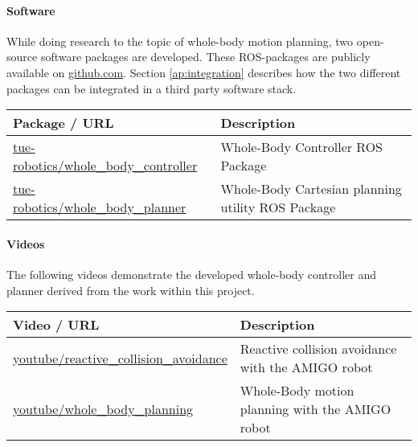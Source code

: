 \paragraph{Software}
While doing research to the topic of whole-body motion planning, two open-source software packages are developed. These ROS-packages are publicly available on \href{http://github.com}{github.com}. Section \ref{ap:integration} describes how the two different packages can be integrated in a third party software stack.
\begin{longtable}{|p{6cm}p{9cm}|}
\hline
\rowcolor[gray]{0.8} \bf Package / URL & \bf Description\\
\hline
\href{https://github.com/tue-robotics/amigo_whole_body_controller}{tue-robotics/whole\_body\_controller} & Whole-Body Controller ROS Package \\
\href{https://github.com/tue-robotics/whole_body_planner}{tue-robotics/whole\_body\_planner} & Whole-Body Cartesian planning utility ROS Package \\
\hline
\end{longtable}

\paragraph{Videos}
\label{videos}
The following videos demonstrate the developed whole-body controller and planner derived from the work within this project. 
\begin{longtable}{|p{6cm}p{9cm}|}
\hline
\rowcolor[gray]{0.8} \bf Video / URL & \bf Description\\
\hline
\href{https://youtu.be/7GcLU9l65eM}{youtube/reactive\_collision\_avoidance} & Reactive collision avoidance with the AMIGO robot \\
\href{https://youtu.be/dibi1lapwOE}{youtube/whole\_body\_planning} & Whole-Body motion planning with the AMIGO robot\\
\hline
\end{longtable}

